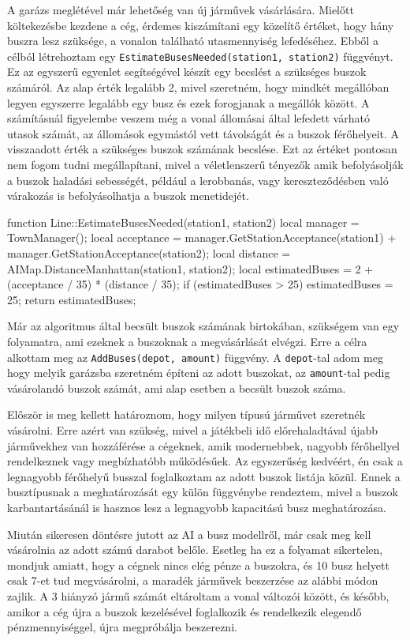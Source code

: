 A garázs meglétével már lehetőség van új járművek vásárlására. Mielőtt költekezésbe kezdene a cég, érdemes kiszámítani egy közelítő értéket, hogy hány buszra lesz szüksége, a vonalon található utasmennyiség lefedéséhez. Ebből a célból létrehoztam egy \texttt{EstimateBusesNeeded(station1, station2)} függvényt. Ez az egyszerű egyenlet segítségével készít egy becslést a szükséges buszok számáról. Az alap érték legalább 2, mivel szeretném, hogy mindkét megállóban legyen egyszerre legalább egy busz és ezek forogjanak a megállók között. A számításnál figyelembe veszem még a vonal állomásai által lefedett várható utasok számát, az állomások egymástól vett távolságát és a buszok férőhelyeit. A visszaadott érték a szükséges buszok számának becslése. Ezt az értéket pontosan nem fogom tudni megállapítani, mivel a véletlenszerű tényezők amik befolyásolják a buszok haladási sebességét, például a lerobbanás, vagy kereszteződésben való várakozás is befolyásolhatja a buszok menetidejét.
\begin{cpp}
function Line::EstimateBusesNeeded(station1, station2)
{
  local manager = TownManager();
  local acceptance = manager.GetStationAcceptance(station1) +
   manager.GetStationAcceptance(station2);
  local distance = AIMap.DistanceManhattan(station1, station2);
  local estimatedBuses = 2 + (acceptance / 35) * (distance / 35);
  if (estimatedBuses > 25) {
    estimatedBuses = 25;
  }
  return estimatedBuses;
}
\end{cpp}

Már az algoritmus által becsült buszok számának birtokában, szükségem van egy folyamatra, ami ezeknek a buszoknak a megvásárlását elvégzi. Erre a célra alkottam meg az \texttt{AddBuses(depot, amount)} függvény. A \texttt{depot}-tal adom meg hogy melyik garázsba szeretném építeni az adott buszokat, az \texttt{amount}-tal pedig vásárolandó buszok számát, ami alap esetben a becsült buszok száma.

Először is meg kellett határoznom, hogy milyen típusú járművet szeretnék vásárolni. Erre azért van szükség, mivel a játékbeli idő előrehaladtával újabb járművekhez van hozzáférése a cégeknek, amik modernebbek, nagyobb férőhellyel rendelkeznek vagy megbízhatóbb működésűek. Az egyszerűség kedvéért, én csak a legnagyobb férőhelyű busszal foglalkoztam az adott buszok listája közül. Ennek a busztípusnak a meghatározását egy külön függvénybe rendeztem, mivel a buszok karbantartásánál is hasznos lesz a legnagyobb kapacitású busz meghatározása.

Miután sikeresen döntésre jutott az AI a busz modellről, már csak meg kell vásárolnia az adott számú darabot belőle. Esetleg ha ez a folyamat sikertelen, mondjuk amiatt, hogy a cégnek nincs elég pénze a buszokra, és 10 busz helyett csak 7-et tud megvásárolni, a maradék járművek beszerzése az alábbi módon zajlik. A 3 hiányzó jármű számát eltároltam a vonal változói között, és később, amikor a cég újra a buszok kezelésével foglalkozik és rendelkezik elegendő pénzmennyiséggel, újra megpróbálja beszerezni.

